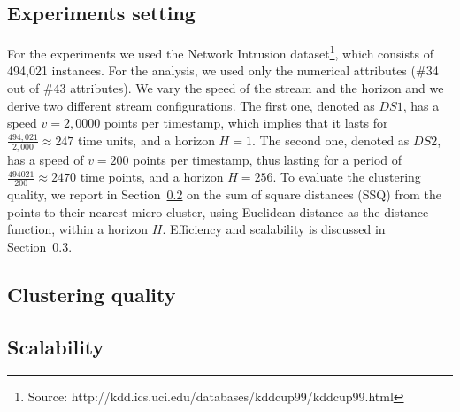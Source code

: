 \subsection{Experiments setting}
For the experiments we used the Network Intrusion dataset\footnote{Source: http://kdd.ics.uci.edu/databases/kddcup99/kddcup99.html}, which consists of 494,021 instances. For the analysis, we used only the numerical attributes (\#34 out of \#43 attributes).
We vary the speed of the stream and the horizon and we derive two different stream configurations.
The first one, denoted as $DS1$, has a speed $v=2,0000$ points per timestamp, which implies that it lasts for $\frac{494,021}{2,000} \approx 247$ time units, and a horizon $H=1$. 
The second one, denoted as $DS2$, has a speed of $v=200$ points per timestamp, thus lasting for a period of $\frac{494021}{200} \approx 2470$ time points, and a horizon $H=256$.
To evaluate the clustering quality, we report in Section~\ref{sec:expQuality} on the sum of square distances (SSQ) from the points to their nearest micro-cluster, using Euclidean distance as the distance function, within a horizon $H$. Efficiency and scalability is discussed in Section~\ref{sec:expScalability}. 

\subsection{Clustering quality}
\label{sec:expQuality}



\subsection{Scalability}
\label{sec:expScalability}
